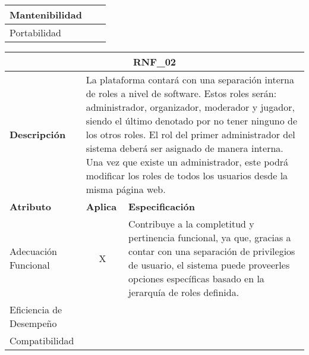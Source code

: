 \begin{center}
\begin{tabular}{ | p{2cm}| p{8cm} | p{5cm} |}
    \multicolumn{1}{|p{3.5cm}|}{\nohyphens{Mantenibilidad}} & \multicolumn{1}{|c|}{} & \multicolumn{1}{|p{10cm}|}{} \\ \hline
    
    \multicolumn{1}{|p{3.5cm}|}{\nohyphens{Portabilidad}} & \multicolumn{1}{|c|}{} & \multicolumn{1}{|p{10cm}|}{} \\

    \hline
  \end{tabular}
  
  \label{table:rnf:api}
\end{center}

\begin{center}
  \begin{tabular}{ | p{2cm}| p{8cm} | p{5cm} |}
    \hline
    \multicolumn{3}{|c|}{\textbf{RNF\_02}} \\
    \hline
    
    \multicolumn{1}{|p{2cm}|}{\textbf{Descripción}} & \multicolumn{2}{|p{13cm}|}{La plataforma contará con una separación interna de roles a nivel de software. Estos roles serán: administrador, organizador, moderador y jugador, siendo el último denotado por no tener ninguno de los otros roles. El rol del primer administrador del sistema deberá ser asignado de manera interna. Una vez que existe un administrador, este podrá modificar los roles de todos los usuarios desde la misma página web.} \\ \hline
    
    \multicolumn{1}{|p{3.5cm}|}{\textbf{{Atributo}}} & \multicolumn{1}{|p{1.5cm}|}{\textbf{Aplica}} & \multicolumn{1}{|p{10cm}|}{\textbf{Especificación}} \\ \hline
    
    \multicolumn{1}{|p{3.5cm}|}{\nohyphens{Adecuación Funcional}} & \multicolumn{1}{|c|}{X} & \multicolumn{1}{|p{10cm}|}{Contribuye a la completitud y pertinencia funcional, ya que, gracias a contar con una separación de privilegios de usuario, el sistema puede proveerles opciones específicas basado en la jerarquía de roles definida.} \\ \hline
    
    \multicolumn{1}{|p{3.5cm}|}{\nohyphens{Eficiencia de Desempeño}} & \multicolumn{1}{|c|}{} & \multicolumn{1}{|p{10cm}|}{} \\ \hline
    
    \multicolumn{1}{|p{3.5cm}|}{\nohyphens{Compatibilidad}} & \multicolumn{1}{|c|}{} & \multicolumn{1}{|p{10cm}|}{} \\ \hline
    

\end{tabular}
\end{center}
